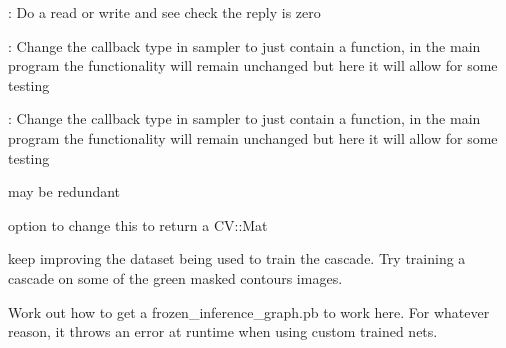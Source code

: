 
\begin{DoxyRefList}
\item[\label{todo__todo000010}%
\Hypertarget{todo__todo000010}%
Member \hyperlink{DriverSensorTest_8cpp_a0d54f5e177d12a6c804fa4396c287cae}{B\+O\+O\+S\+T\+\_\+\+A\+U\+T\+O\+\_\+\+T\+E\+S\+T\+\_\+\+C\+A\+SE} (I2\+C\+\_\+\+P\+L\+A\+I\+N\+\_\+\+W\+R\+I\+T\+E\+\_\+\+R\+E\+AD)]\+: Do a read or write and see check the reply is zero 
\item[\label{todo__todo000011}%
\Hypertarget{todo__todo000011}%
Member \hyperlink{IntegrationTests_8cpp_adc1d3c8e593faa9c35d22df377ba1a08}{B\+O\+O\+S\+T\+\_\+\+A\+U\+T\+O\+\_\+\+T\+E\+S\+T\+\_\+\+C\+A\+SE} (I2\+C\+\_\+\+S\+A\+M\+P\+L\+E\+R\+\_\+\+R\+E\+AD)]\+: Change the callback type in sampler to just contain a function, in the main program the functionality will remain unchanged but here it will allow for some testing 
\item[\label{todo__todo000012}%
\Hypertarget{todo__todo000012}%
Member \hyperlink{IntegrationTests_8cpp_aeb3242c69cc2b315f8e5e28c29b04392}{B\+O\+O\+S\+T\+\_\+\+A\+U\+T\+O\+\_\+\+T\+E\+S\+T\+\_\+\+C\+A\+SE} (C\+O\+N\+T\+R\+O\+L\+L\+E\+R\+\_\+\+O\+P\+E\+R\+A\+T\+I\+O\+N\+\_\+\+H\+A\+N\+D\+L\+E\+R\+\_\+\+F\+O\+R\+C\+E\+\_\+\+F\+L\+A\+GS)]\+: Change the callback type in sampler to just contain a function, in the main program the functionality will remain unchanged but here it will allow for some testing 
\item[\label{todo__todo000002}%
\Hypertarget{todo__todo000002}%
Member \hyperlink{classCamera_afd88c2780203f02c9fe236a7239e414c}{Camera\+:\+:Initialize} ()]may be redundant  
\item[\label{todo__todo000003}%
\Hypertarget{todo__todo000003}%
Member \hyperlink{classCamera_a07670e99337fb322375a412222c06ada}{Camera\+:\+:take\+Picture} ()]option to change this to return a C\+V\+::\+Mat  
\item[\label{todo__todo000005}%
\Hypertarget{todo__todo000005}%
Member \hyperlink{classCamera_a09931f84cc8e66e4e4c1181cb1cb4af6}{Camera\+:\+:take\+Scan\+Cascade} ()]keep improving the dataset being used to train the cascade. Try training a cascade on some of the green masked contours images.  
\item[\label{todo__todo000004}%
\Hypertarget{todo__todo000004}%
Member \hyperlink{classCamera_a59f08842d3de300419c74b12bee44d47}{Camera\+:\+:take\+Scan\+D\+N\+N\+Picture} ()]Work out how to get a frozen\+\_\+inference\+\_\+graph.\+pb to work here. For whatever reason, it throws an error at runtime when using custom trained nets.  

\end{DoxyRefList}
